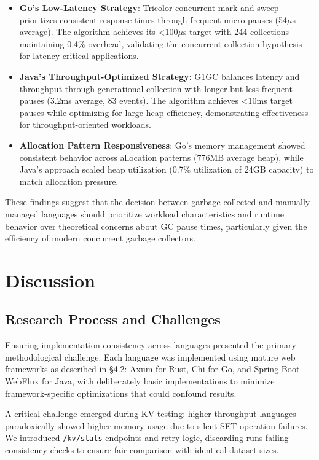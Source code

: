 \documentclass{article}
\begin{document}
\begin{itemize}
    \item \textbf{Go's Low-Latency Strategy}: Tricolor concurrent mark-and-sweep prioritizes consistent response times through frequent micro-pauses (54$\mu$s average). The algorithm achieves its <100$\mu$s target with 244 collections maintaining 0.4\% overhead, validating the concurrent collection hypothesis for latency-critical applications.
    
    \item \textbf{Java's Throughput-Optimized Strategy}: G1GC balances latency and throughput through generational collection with longer but less frequent pauses (3.2ms average, 83 events). The algorithm achieves <10ms target pauses while optimizing for large-heap efficiency, demonstrating effectiveness for throughput-oriented workloads.
    
    \item \textbf{Allocation Pattern Responsiveness}: Go's memory management showed consistent behavior across allocation patterns (776MB average heap), while Java's approach scaled heap utilization (0.7\% utilization of 24GB capacity) to match allocation pressure.
\end{itemize}

These findings suggest that the decision between garbage-collected and manually-managed languages should prioritize workload characteristics and runtime behavior over theoretical concerns about GC pause times, particularly given the efficiency of modern concurrent garbage collectors.

\section{Discussion}

\subsection{Research Process and Challenges}

Ensuring implementation consistency across languages presented the primary methodological challenge. Each language was implemented using mature web frameworks as described in §4.2: Axum for Rust, Chi for Go, and Spring Boot WebFlux for Java, with deliberately basic implementations to minimize framework-specific optimizations that could confound results.

A critical challenge emerged during KV testing: higher throughput languages paradoxically showed higher memory usage due to silent SET operation failures. We introduced \texttt{/kv/stats} endpoints and retry logic, discarding runs failing consistency checks to ensure fair comparison with identical dataset sizes.
\end{document}
